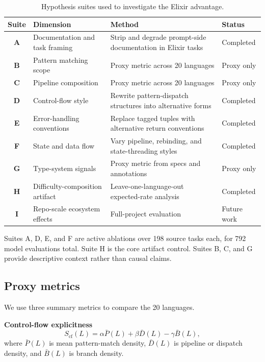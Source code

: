 \documentclass[11pt]{article}
\newcommand{\elixir}{Elixir}
\newcommand{\cfscore}{S_{\mathrm{cf}}}
\begin{document}
\begin{table}[H]
\centering
\caption{Hypothesis suites used to investigate the \elixir{} advantage.}
\label{tab:suites}
\small
\begin{tabularx}{\textwidth}{>{\bfseries}c l X l}
\toprule
Suite & Dimension & Method & Status \\
\midrule
A & Documentation and task framing & Strip and degrade prompt-side documentation in \elixir{} tasks & Completed \\
B & Pattern matching scope & Proxy metric across 20 languages & Proxy only \\
C & Pipeline composition & Proxy metric across 20 languages & Proxy only \\
D & Control-flow style & Rewrite pattern-dispatch structures into alternative forms & Completed \\
E & Error-handling conventions & Replace tagged tuples with alternative return conventions & Completed \\
F & State and data flow & Vary pipeline, rebinding, and state-threading styles & Completed \\
G & Type-system signals & Proxy metric from specs and annotations & Proxy only \\
H & Difficulty-composition artifact & Leave-one-language-out expected-rate analysis & Completed \\
I & Repo-scale ecosystem effects & Full-project evaluation & Future work \\
\bottomrule
\end{tabularx}
\end{table}

Suites A, D, E, and F are active ablations over 198 source tasks each, for 792 model evaluations total. Suite H is the core artifact control. Suites B, C, and G provide descriptive context rather than causal claims.

\subsection{Proxy metrics}

We use three summary metrics to compare the 20 languages.

\textbf{Control-flow explicitness}
\begin{equation}
\cfscore(L) = \alpha \bar{P}(L) + \beta \bar{D}(L) - \gamma \bar{B}(L),
\label{eq:cf}
\end{equation}
where $\bar{P}(L)$ is mean pattern-match density, $\bar{D}(L)$ is pipeline or dispatch density, and $\bar{B}(L)$ is branch density.
\end{document}
